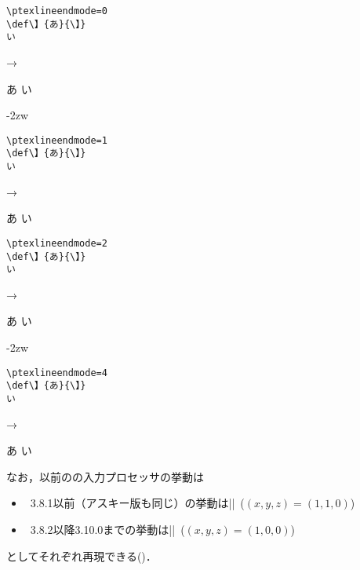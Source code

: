 \documentclass[a4paper,11pt,nomag,dvipdfmx]{jsarticle}
\begin{document}
\begin{dangerous}
\begin{enumerate}
    \medskip
    \begin{minipage}[t]{13zw}
\begin{verbatim}
\ptexlineendmode=0
\def\】{あ}{\】}
い
\end{verbatim}
    \end{minipage}\quad →\quad
    \begin{minipage}[t]{5zw}
\def\】{あ}{\】}
い
    \end{minipage}%
    \hfill\vrule\hfill\kern-2zw
    \begin{minipage}[t]{13zw}
\begin{verbatim}
\ptexlineendmode=1
\def\】{あ}{\】}
い
\end{verbatim}
    \end{minipage}\quad →\quad
    \begin{minipage}[t]{5zw}
\def\】{あ}{\】}
い
    \end{minipage}
    \par\medskip
    \begin{minipage}[t]{13zw}
\begin{verbatim}
\ptexlineendmode=2
\def\】{あ}{\】}
い
\end{verbatim}
    \end{minipage}\quad →\quad
    \begin{minipage}[t]{5zw}
\def\】{あ}{\】}
い
    \end{minipage}%
    \hfill\vrule\hfill\kern-2zw
    \begin{minipage}[t]{13zw}
\begin{verbatim}
\ptexlineendmode=4
\def\】{あ}{\】}
い
\end{verbatim}
    \end{minipage}\quad →\quad
    \begin{minipage}[t]{5zw}
\def\】{あ}{\】}
い
    \end{minipage}
    \medskip
  \end{enumerate}

  なお，以前の\pTeX の入力プロセッサの挙動は
  \begin{itemize}
    \item \pTeX~3.8.1以前（アスキー版も同じ）の挙動は||~($(x,y,z)=(1,1,0)$)
    \item \pTeX~3.8.2以降3.10.0までの挙動は||~($(x,y,z)=(1,0,0)$)
  \end{itemize}
  としてそれぞれ再現できる(\cite{tjb87})．

\end{dangerous}
\end{document}
